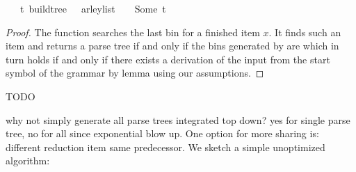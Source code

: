 \begin{isabellebody}
\ \ \ {\isachardoublequoteopen}{\isacharparenleft}{\kern0pt}{\isasymexists}t{\isachardot}{\kern0pt}\ build{\isacharunderscore}{\kern0pt}tree\ {\isasymG}\ {\isasymomega}\ {\isacharparenleft}{\kern0pt}{\isasymE}arley{\isacharunderscore}{\kern0pt}list\ {\isasymG}\ {\isasymomega}{\isacharparenright}{\kern0pt}\ {\isacharequal}{\kern0pt}\ Some\ t{\isacharparenright}{\kern0pt}\ {\isasymlongleftrightarrow}\ {\isasymG}\ {\isasymturnstile}\ {\isacharbrackleft}{\kern0pt}{\isasymSS}\ {\isasymG}{\isacharbrackright}{\kern0pt}\ {\isasymRightarrow}\isactrlsup {\isacharasterisk}{\kern0pt}\ {\isasymomega}{\isachardoublequoteclose}%
\isadelimproof
%
\endisadelimproof
%
\isatagproof
%
\endisatagproof
{\isafoldproof}%
%
\isadelimproof
%
\endisadelimproof
%
\begin{isamarkuptext}%
\begin{proof}

The function  searches the last bin for a finished item $x$.
It finds such an item and returns a parse tree if and only if the bins generated
by  are  which in turn holds if and only if
there exists a derivation of the input from the start symbol of the grammar by
lemma  using our assumptions.

\end{proof}%
\end{isamarkuptext}\isamarkuptrue%
%
\isadelimdocument
%
\endisadelimdocument
%
\isatagdocument
%
\isamarkuptrue%
%
\endisatagdocument
{\isafolddocument}%
%
\isadelimdocument
%
\endisadelimdocument
%
\begin{isamarkuptext}%
TODO%
\end{isamarkuptext}\isamarkuptrue%
%
\begin{isamarkuptext}%
why not simply generate all parse trees integrated top down? yes for single parse tree, no for
all since exponential blow up. One option for more sharing is: different reduction item same predecessor.
We sketch a simple unoptimized algorithm:


\end{isamarkuptext}
\end{isabellebody}
